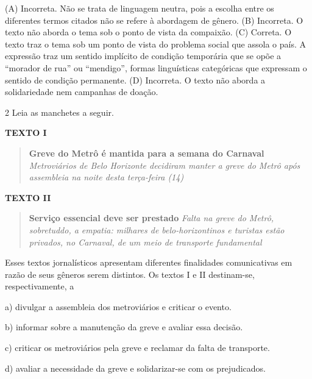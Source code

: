 (A) Incorreta. Não se trata de linguagem neutra, pois a escolha entre os
diferentes termos citados não se refere à abordagem de gênero. (B)
Incorreta. O texto não aborda o tema sob o ponto de vista da compaixão.
(C) Correta. O texto traz o tema sob um ponto de vista do problema
social que assola o país. A expressão traz um sentido implícito de
condição temporária que se opõe a ``morador de rua'' ou ``mendigo'',
formas linguísticas categóricas que expressam o sentido de condição
permanente. (D) Incorreta. O texto não aborda a solidariedade nem
campanhas de doação.

\num{2} Leia as manchetes a seguir.

\textbf{TEXTO I}

\begin{quote}
\textbf{Greve do Metrô é mantida para a semana do Carnaval}
\emph{Metroviários de Belo Horizonte decidiram manter a greve do Metrô
após assembleia na noite desta terça-feira (14)}
\end{quote}


\textbf{TEXTO II}

\begin{quote}
\textbf{Serviço essencial deve ser prestado} \emph{Falta na greve do
Metrô, sobretuddo, a empatia: milhares de belo-horizontinos e turistas
estão privados, no Carnaval, de um meio de transporte fundamental}
\end{quote}


Esses textos jornalísticos apresentam diferentes finalidades
comunicativas em razão de seus gêneros serem distintos. Os textos I e II
destinam-se, respectivamente, a

a) divulgar a assembleia dos metroviários e criticar o evento.

b) informar sobre a manutenção da greve e avaliar essa decisão.

c) criticar os metroviários pela greve e reclamar da falta de
transporte.

d) avaliar a necessidade da greve e solidarizar-se com os prejudicados.


